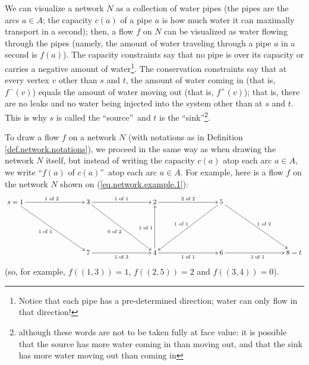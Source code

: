 \documentclass[numbers=enddot,12pt,final,onecolumn,notitlepage]{scrartcl}%
\theoremstyle{definition}
\newcommand{\of}{\text{ of }}
\begin{document}
We can visualize a network $N$ as a collection of water pipes (the pipes are
the arcs $a\in A$; the capacity $c\left(  a\right)  $ of a pipe $a$ is how
much water it can maximally transport in a second); then, a flow $f$ on $N$
can be visualized as water flowing through the pipes (namely, the amount of
water traveling through a pipe $a$ in a second is $f\left(  a\right)  $). The
capacity constraints say that no pipe is over its capacity or carries a
negative amount of water\footnote{Notice that each pipe has a pre-determined
direction; water can only flow in that direction!}. The conservation
constraints say that at every vertex $v$ other than $s$ and $t$, the amount of
water coming in (that is, $f^{-}\left(  v\right)  $) equals the amount of
water moving out (that is, $f^{+}\left(  v\right)  $); that is, there are no
leaks and no water being injected into the system other than at $s$ and $t$.
This is why $s$ is called the \textquotedblleft source\textquotedblright\ and
$t$ is the \textquotedblleft sink\textquotedblright\footnote{although these
words are not to be taken fully at face value: it is possible that the source
has more water coming in than moving out, and that the sink has more water
moving out than coming in}.

To draw a flow $f$ on a network $N$ (with notations as in Definition
\ref{def.network.notations}), we proceed in the same way as when drawing the
network $N$ itself, but instead of writing the capacity $c\left(  a\right)  $
atop each arc $a\in A$, we write \textquotedblleft$f\left(  a\right)  $ of
$c\left(  a\right)  $\textquotedblright\ atop each arc $a\in A$. For example,
here is a flow $f$ on the network $N$ shown on (\ref{eq.network.example.1}):%
\begin{equation}%
\xymatrix@C=7pc@R=5pc{
s = 1 \ar[r]^{1 \of2} \ar[dr]_{1 \of1} & 3 \ar[r]^{1 \of1} \ar[dr]_{0 \of2}
& 2 \ar[r]^{2 \of2} & 5 \ar[dl]_{1 \of1} \ar[dr]^{1 \of2} \\
& 7 \ar[r]_{1 \of3} & 4 \ar[u]^{1 \of1} \ar[r]_{1 \of1} & 6 \ar[r]_{1 \of1}
& 8 = t
}
\label{eq.flow.example.1}%
\end{equation}
(so, for example, $f\left(  \left(  1,3\right)  \right)  =1$, $f\left(
\left(  2,5\right)  \right)  =2$ and $f\left(  \left(  3,4\right)  \right)
=0$).
\end{document}
